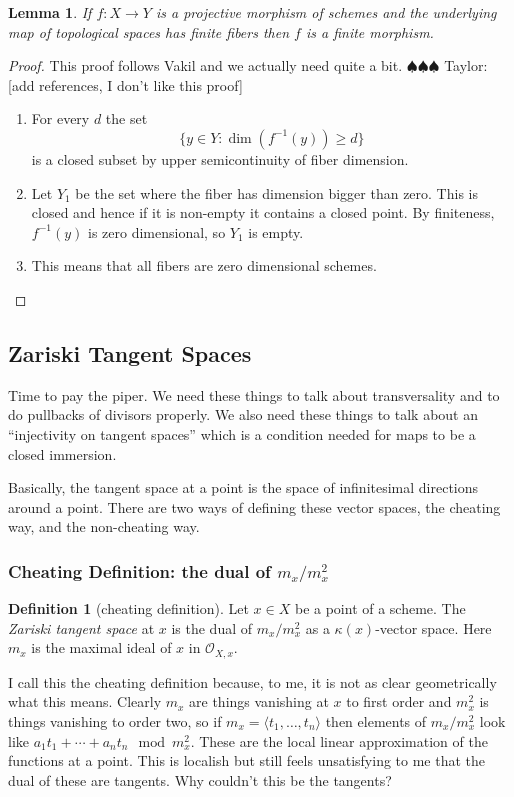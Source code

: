 \documentclass[12pt]{article}
\numberwithin{equation}{section}
\newtheorem{lemma}[theorem]{Lemma}
\theoremstyle{definition}
\newtheorem{definition}[theorem]{Definition}
\theoremstyle{remark}
\newcommand{\Ocal}{\mathcal{O}}
\newcommand{\taylor}[1]{{\color{blue} \sf $\spadesuit\spadesuit\spadesuit$ Taylor: [#1]}}
\begin{document}
\begin{lemma}
	If $f:X\to Y$ is a projective morphism of schemes and the underlying map of topological spaces has finite fibers then $f$ is a finite morphism.
\end{lemma}
\begin{proof}
	This proof follows Vakil and we actually need quite a bit. \taylor{add references, I don't like this proof}
	\begin{enumerate}
		\item For every $d$ the set
		 $$\lbrace y \in Y : \dim (f^{-1}(y)) \geq d \rbrace$$
		 is a closed subset by upper semicontinuity of fiber dimension.
		\item Let $Y_1$ be the set where the fiber has dimension bigger than zero.
		This is closed and hence if it is non-empty it contains a closed point. 
		By finiteness, $f^{-1}(y)$ is zero dimensional, so $Y_1$ is empty.
		\item This means that all fibers are zero dimensional schemes.  
	\end{enumerate}
\end{proof}

\subsection{Zariski Tangent Spaces}
Time to pay the piper. 
We need these things to talk about transversality and to do pullbacks of divisors properly. 
We also need these things to talk about an ``injectivity on tangent spaces'' which is a condition needed for maps to be a closed immersion.

Basically, the tangent space at a point is the space of infinitesimal directions around a point. 
There are two ways of defining these vector spaces, the cheating way, and the non-cheating way. 

\subsubsection{Cheating Definition: the dual of $m_x/m_x^2$}
\begin{definition}[cheating definition]
	Let $x\in X$ be a point of a scheme. 
	The \emph{Zariski tangent space} at $x$ is the dual of $m_x/m_x^2$ as a $\kappa(x)$-vector space. 
	Here $m_x$ is the maximal ideal of $x$ in $\Ocal_{X,x}$.
\end{definition}

I call this the cheating definition because, to me, it is not as clear geometrically what this means. 
Clearly $m_x$ are things vanishing at $x$ to first order and $m_x^2$ is things vanishing to order two, so if $m_x=\langle t_1,\ldots,t_n\rangle$ then elements of $m_x/m_x^2$ look like $a_1t_1 + \cdots + a_n t_n \mod m_x^2$.
These are the local linear approximation of the functions at a point. 
This is localish but still feels unsatisfying to me that the dual of these are tangents. 
Why couldn't this be the tangents?
\end{document}
